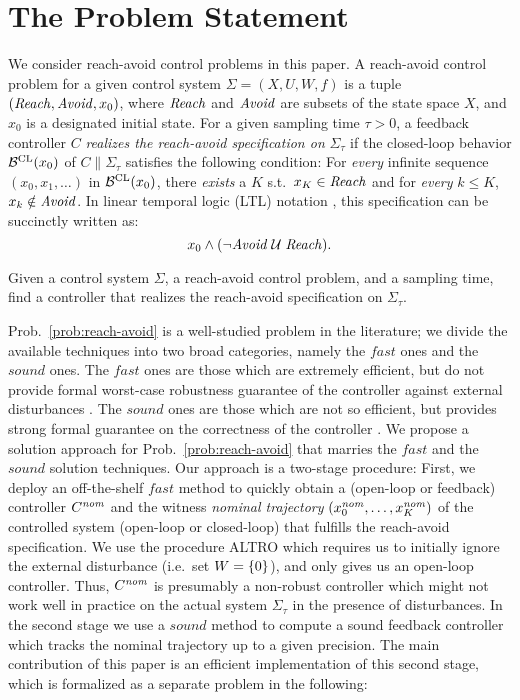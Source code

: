 
\section{The Problem Statement}

We consider reach-avoid control problems in this paper.
A reach-avoid control problem for a given control system $\Sigma=(X,U,W,f)$ is a tuple $(\mathit{Reach},\mathit{Avoid},x_0)$, where $\mathit{Reach}$ and $\mathit{Avoid}$ are subsets of the state space $X$, and $x_0$ is a designated initial state.
For a given sampling time $\tau>0$, a feedback controller $C$ \emph{realizes the reach-avoid specification on} $\Sigma_\tau$ if the closed-loop behavior $\mathcal{B}^{\mathrm{CL}}(x_0)$ of $C\parallel\Sigma_\tau$ satisfies the following condition: For \emph{every} infinite sequence $(x_0,x_1,\ldots)$ in $\mathcal{B}^{\mathrm{CL}}(x_0)$, there \emph{exists} a $K$ s.t.\ $x_K\in \mathit{Reach}$ and for \emph{every} $k\leq K$, $x_k\notin \mathit{Avoid}$. 
In linear temporal logic (LTL) notation \cite{Baier book}, this specification can be succinctly written as:
\begin{equation}\label{eq:spec}
	x_0 \wedge (\lnot \mathit{Avoid}\; \mathcal{U}\;\mathit{Reach}).
\end{equation}

\begin{problem}\label{prob:reach-avoid}
	Given a control system $\Sigma$, a reach-avoid control problem, and a sampling time, find a controller that realizes the reach-avoid specification on $\Sigma_\tau$.
\end{problem}

Prob.~\ref{prob:reach-avoid} is a well-studied problem in the literature; we divide the available techniques into two broad categories, namely the $\mathit{fast}$ ones and the $\mathit{sound}$ ones.
The $\mathit{fast}$ ones are those which are extremely efficient, but do not provide formal worst-case robustness guarantee of the controller against external disturbances \cite{Altro, AI and path planning methods}.
The $\mathit{sound}$ ones are those which are not so efficient, but provides strong formal guarantee on the correctness of the controller \cite{ABCD, Hamilton-Jacobi, LQR tree}.
We propose a solution approach for Prob.~\ref{prob:reach-avoid} that marries the $\mathit{fast}$ and the $\mathit{sound}$ solution techniques.
Our approach is a two-stage procedure: 
First, we deploy an off-the-shelf $\mathit{fast}$ method to quickly obtain a (open-loop or feedback) controller $C^{\mathit{nom}}$ and the witness \emph{nominal trajectory} $(x_0^{\mathit{nom}},\ldots,x_K^{\mathit{nom}})$ of the controlled system (open-loop or closed-loop) that fulfills the reach-avoid specification.
We use the procedure ALTRO \cite{altro} which requires us to initially ignore the external disturbance (i.e.\ set $W=\{ 0 \}$), and only gives us an open-loop controller.
Thus, $C^{\mathit{nom}}$ is presumably a non-robust controller which might not work well in practice on the actual system $\Sigma_\tau$ in the presence of disturbances.
In the second stage we use a $\mathit{sound}$ method to compute a sound feedback controller which tracks the nominal trajectory up to a given precision.
The main contribution of this paper is an efficient implementation of this second stage, which is formalized as a separate problem in the following:

